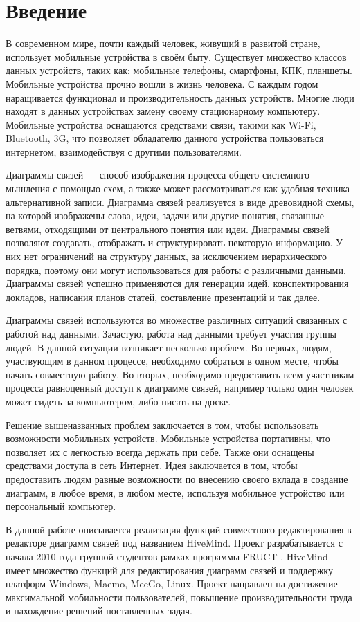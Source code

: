 \newpage

\chapter*{Введение}
\label{chap:introduction}

В современном мире, почти каждый человек, живущий в развитой стране, использует
мобильные устройства в своём быту. Существует множество классов данных
устройств, таких как: мобильные телефоны, смартфоны, КПК, планшеты. Мобильные
устройства прочно вошли в жизнь человека. С каждым годом наращивается функционал
и производительность данных устройств. Многие люди находят в данных устройствах
замену своему стационарному компьютеру. Мобильные устройства оснащаются
средствами связи, такими как Wi-Fi, Bluetooth, 3G, что позволяет обладателю
данного устройства пользоваться интернетом, взаимодействуя с другими
пользователями.

Диаграммы связей --- способ изображения процесса общего системного мышления с
помощью схем, а также может рассматриваться как удобная техника альтернативной
записи. Диаграмма связей реализуется в виде древовидной схемы, на которой
изображены слова, идеи, задачи или другие понятия, связанные ветвями, отходящими
от центрального понятия или идеи. Диаграммы связей позволяют создавать,
отображать и структурировать некоторую информацию. У них нет ограничений на
структуру данных, за исключением иерархического порядка, поэтому они могут
использоваться для работы с различными данными. Диаграммы связей успешно
применяются для генерации идей, конспектирования докладов, написания планов
статей, составление презентаций и так далее.

Диаграммы связей используются во множестве различных ситуаций связанных с
работой над данными. Зачастую, работа над данными требует участия группы людей. В данной
ситуации возникает несколько проблем. Во-первых, людям, участвующим в данном
процессе, необходимо собраться в одном месте, чтобы начать совместную работу.
Во-вторых, необходимо предоставить всем участникам процесса равноценный доступ к
диаграмме связей, например только один человек может сидеть за компьютером, либо
писать на доске.

Решение вышеназванных проблем заключается в том, чтобы использовать возможности
мобильных устройств. Мобильные устройства портативны, что позволяет их с
легкостью всегда держать при себе. Также они оснащены средствами доступа в сеть
Интернет. Идея заключается в том, чтобы предоставить людям равные возможности по
внесению своего вклада в создание диаграмм, в любое время, в любом месте,
используя мобильное устройство или персональный компьютер.

В данной работе описывается реализация функций совместного редактирования в
редакторе диаграмм связей под названием HiveMind. Проект разрабатывается с
начала 2010 года группой студентов рамках программы FRUCT
\cite{hivemind-8th-fruct}. HiveMind имеет множество функций для редактирования
диаграмм связей и поддержку платформ Windows, Maemo, MeeGo, Linux. Проект
направлен на достижение максимальной мобильности пользователей, повышение
производительности труда и нахождение решений поставленных задач.

